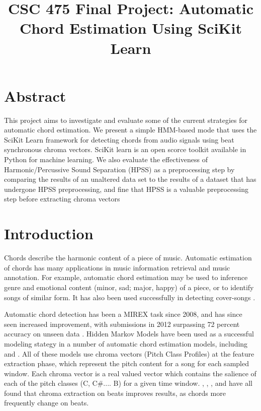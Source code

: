 \documentclass{article}
\title{CSC 475 Final Project: Automatic Chord Estimation Using SciKit Learn}
\begin{document}
%
\maketitle
%


\section{Abstract}\label{sec:desoutline}
This project aims to investigate and evaluate some of the current strategies
for automatic chord estimation. We present a simple HMM-based mode that uses
the SciKit Learn framework for detecting chords from audio signals using beat 
synchronous chroma vectors.  SciKit learn is an open scorce toolkit available
in Python for machine learning. We also evaluate the effectiveness of 
Harmonic/Percussive Sound Separation (HPSS) as a preprocessing step by comparing
the results of an unaltered data set to the results of a dataset that has undergone HPSS
preprocessing, and fine that HPSS is a valuable preprocessing step before extracting
chroma vectors

\section{Introduction}\label{sec:intro}

Chords describe the harmonic content of a piece of music. Automatic estimation
of chords has many applications in music information retrieval and music
annotation. For example, automatic chord estimation may be used to inference
genre and emotional content (minor, sad; major, happy) of a piece, or to
identify songs of similar form.  It has also been used successfully in
detecting cover-songs \cite{Papadopoulos:18}.

Automatic chord detection has been a MIREX task since 2008, and has since seen
increased improvement, with submissions in 2012 surpassing 72 percent accuracy
on unseen data \cite{McVicar:00}. Hidden Markov Models have been used as a
successful modeling stategy in a number of automatic chord estimation models,
including \cite{Ueda:01} \cite{Lee:15} \cite{Ueda:19} and
\cite{Papadopoulos:18}. All of these models use chroma vectors (Pitch Class
Profiles) at the feature extraction phase, which represent the pitch content
for a song for each sampled window. Each chroma vector is a real valued vector
which contains the salience of each of the pitch classes (C, C\#.... B) for a
given time window. \cite{McVicar:00},  \cite{Lee:15}, \cite{Papadopoulos:18},
and\cite{Zenz:20} have all found that chroma extraction on beats improves
results, as chords more frequently change on beats.
\end{document}
